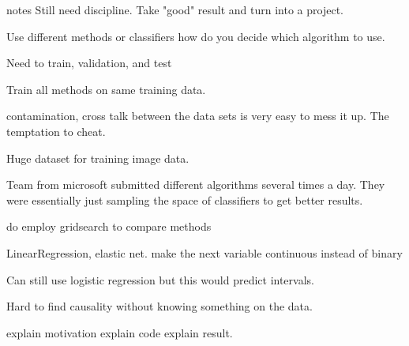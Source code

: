 notes
Still need discipline.
Take "good" result and turn
into a project.

Use different methods or classifiers
how do you decide which algorithm to use.

Need to train, validation, and test

Train all methods on same training data.

contamination, cross talk between the data
sets is very easy to mess it up. The temptation to
cheat.

Huge dataset for training image data.

Team from microsoft submitted different algorithms
several times a day.
They were essentially just sampling
the space of classifiers
to get better results. 

do employ gridsearch to compare methods

LinearRegression, elastic net.
make the next variable continuous instead of binary

Can still use logistic regression but this would predict
intervals.

Hard to find causality without knowing something on the data.

explain motivation
explain code
explain result. 